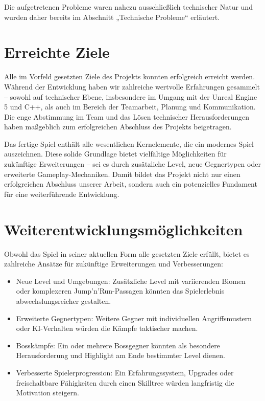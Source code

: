 \documentclass[oneside]{ausarbeitung}
\begin{document}
Die aufgetretenen Probleme waren nahezu ausschließlich technischer Natur und wurden daher bereits im Abschnitt „Technische Probleme“ erläutert.

\section{Erreichte Ziele}
\label{sec:erreichteziele}

Alle im Vorfeld gesetzten Ziele des Projekts konnten erfolgreich erreicht werden. Während der Entwicklung haben wir zahlreiche wertvolle Erfahrungen gesammelt – sowohl auf technischer Ebene, insbesondere im Umgang mit der Unreal Engine 5 und C++, als auch im Bereich der Teamarbeit, Planung und Kommunikation. Die enge Abstimmung im Team und das Lösen technischer Herausforderungen haben maßgeblich zum erfolgreichen Abschluss des Projekts beigetragen.

Das fertige Spiel enthält alle wesentlichen Kernelemente, die ein modernes Spiel auszeichnen. Diese solide Grundlage bietet vielfältige Möglichkeiten für zukünftige Erweiterungen – sei es durch zusätzliche Level, neue Gegnertypen oder erweiterte Gameplay-Mechaniken. Damit bildet das Projekt nicht nur einen erfolgreichen Abschluss unserer Arbeit, sondern auch ein potenzielles Fundament für eine weiterführende Entwicklung.


\section{Weiterentwicklungsmöglichkeiten}
\label{sec:weiterentwicklungsmöglichkeiten}

Obwohl das Spiel in seiner aktuellen Form alle gesetzten Ziele erfüllt, bietet es zahlreiche Ansätze für zukünftige Erweiterungen und Verbesserungen:

\begin{itemize}
    \item Neue Level und Umgebungen: Zusätzliche Level mit variierenden Biomen oder komplexeren Jump’n’Run-Passagen könnten das Spielerlebnis abwechslungsreicher gestalten.
    \item Erweiterte Gegnertypen: Weitere Gegner mit individuellen Angriffsmustern oder KI-Verhalten würden die Kämpfe taktischer machen.
    \item Bosskämpfe: Ein oder mehrere Bossgegner könnten als besondere Herausforderung und Highlight am Ende bestimmter Level dienen.
    \item Verbesserte Spielerprogression: Ein Erfahrungssystem, Upgrades oder freischaltbare Fähigkeiten durch einen Skilltree würden langfristig die Motivation steigern.
\end{itemize}
\end{document}
